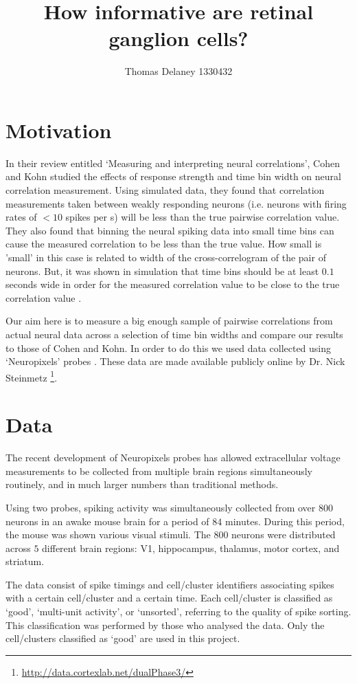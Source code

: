 \documentclass[a4paper,12pt]{article}
\title{How informative are retinal ganglion cells?}
\author{Thomas Delaney 1330432}
\theoremstyle{definition}
\begin{document}
\tableofcontents

\newpage

\section{Motivation}
In their review entitled `Measuring and interpreting neural correlations', Cohen and Kohn studied the effects of response strength and time bin width on neural correlation measurement. Using simulated data, they found that correlation measurements taken between weakly responding neurons (i.e. neurons with firing rates of $<10$ spikes per s) will be less than the true pairwise correlation value. They also found that binning the neural spiking data into small time bins can cause the measured correlation to be less than the true value. How small is 'small' in this case is related to width of the cross-correlogram of the pair of neurons. But, it was shown in simulation that time bins should be at least $0.1$ seconds wide in order for the measured correlation value to be close to the true correlation value \cite{cohen}.

Our aim here is to measure a big enough sample of pairwise correlations from actual neural data across a selection of time bin widths and compare our results to those of Cohen and Kohn. In order to do this we used data collected using `Neuropixels' probes \cite{jun}. These data are made available publicly online by Dr. Nick Steinmetz \footnote{\url{http://data.cortexlab.net/dualPhase3/}}.

\section{Data}
The recent development of Neuropixels probes has allowed extracellular voltage measurements to be collected from multiple brain regions simultaneously routinely, and in much larger numbers than traditional methods.

Using two probes, spiking activity was simultaneously collected from over $800$ neurons in an awake mouse brain for a period of $84$ minutes. During this period, the mouse was shown various visual stimuli. The $800$ neurons were distributed across $5$ different brain regions: V1, hippocampus, thalamus, motor cortex, and striatum.

The data consist of spike timings and cell/cluster identifiers associating spikes with a certain cell/cluster and a certain time. Each cell/cluster is classified as `good', `multi-unit activity', or `unsorted', referring to the quality of spike sorting. This classification was performed by those who analysed the data. Only the cell/clusters classified as `good' are used in this project.
\end{document}
